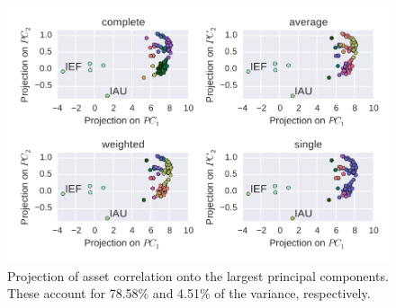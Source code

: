 \begin{figure}[tp]
\centering
\includegraphics{pic/pca_methods.pdf}
\caption{Projection of asset correlation onto the largest principal components. These account for 78.58\% and 4.51\% of the variance, respectively.}
\label{fig:bondsyield}
\end{figure}

